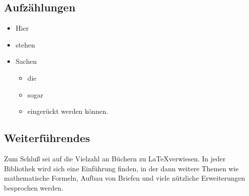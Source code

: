 \subsection{Aufzählungen}

\begin{itemize}
\item  Hier
\item  stehen
\item  Sachen
\begin{itemize}
\item  die
\item  sogar
\item  eingerückt werden können.
\end{itemize}
\end{itemize}



\subsection{Weiterführendes}

Zum Schluß sei auf die Vielzahl an Büchern zu \LaTeX verwiesen. In jeder Bibliothek wird sich eine Einführung finden, in der dann weitere Themen wie mathematische Formeln, Aufbau von Briefen und viele nützliche Erweiterungen besprochen werden.

